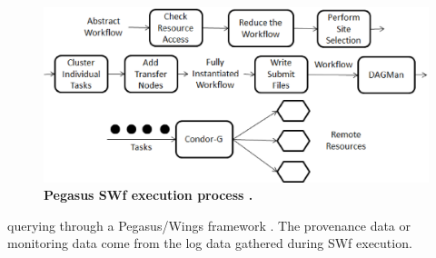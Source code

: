 \begin{figure}
\begin{centering}
\captionsetup{justification=centering}
\includegraphics[width=129mm]{figures/f10}
\par\end{centering}
\caption{\textbf{Pegasus SWf execution process \cite{Deelman2005}. }}
\label{fig:f10} 
\end{figure}
\noindent querying through a Pegasus/Wings framework \cite{Kim2008}. The provenance data or monitoring data come from the log data gathered during SWf execution.

